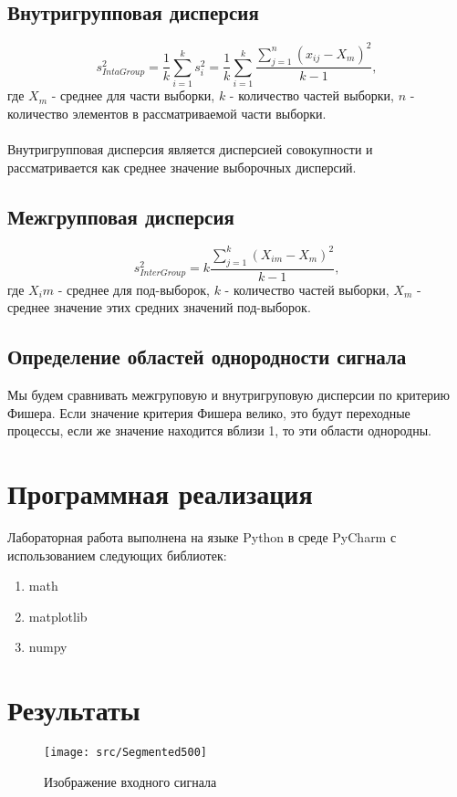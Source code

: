 \documentclass[a4paper]{article}
\begin{document}
\subsection{Внутригрупповая дисперсия}
\begin{equation}
    s_{IntaGroup}^2 = \frac{1}{k} \sum_{i=1}^k s_i^2 = \frac{1}{k} \sum_{i=1}^k \frac{\sum_{j=1}^n (x_{ij} - X_m)^2}{k-1},
\end{equation}
где $X_m$ - среднее для части выборки, $k$ - количество частей выборки, $n$ - количество элементов в рассматриваемой части выборки.\\
\\
Внутригрупповая дисперсия является дисперсией совокупности и рассматривается как среднее значение выборочных дисперсий.

\subsection{Межгрупповая дисперсия}
\begin{equation}
    s_{InterGroup}^2 = k \frac{\sum_{j=1}^k (X_{im} - X_m)^2}{k-1},
\end{equation}
где $X_im$ - среднее для под-выборок, $k$ - количество частей выборки, $X_m$ - среднее значение этих средних значений под-выборок.\\

\subsection{Определение областей однородности сигнала}
Мы будем сравнивать межгруповую и внутригруповую дисперсии по критерию Фишера. Если значение критерия Фишера велико, это будут переходные процессы, если же значение находится вблизи 1, то эти области однородны.


\section{Программная реализация}
\noindent Лабораторная работа выполнена на языке Python в среде PyCharm с использованием следующих библиотек:
 \begin{enumerate}
        \item math
        \item matplotlib
        \item numpy
 \end{enumerate}

\section{Результаты}
	\begin{figure}[H]
		\centering
		\texttt{[image: src/Segmented500]}
		\caption{Изображение входного сигнала}
		\label{fig:signal}
	\end{figure}
\end{document}
